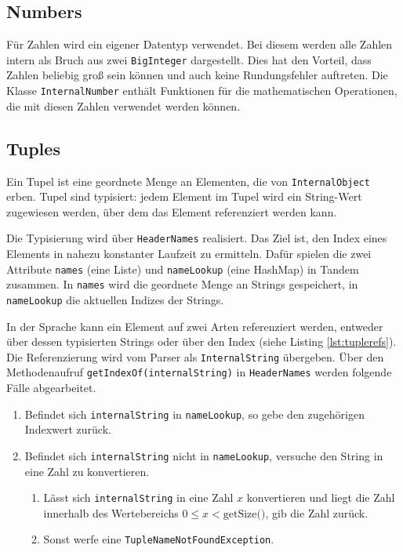 \subsection{Numbers}
Für Zahlen wird ein eigener Datentyp verwendet. Bei diesem werden alle Zahlen intern als Bruch aus zwei \texttt{BigInteger} dargestellt. Dies hat den Vorteil, dass Zahlen beliebig groß sein können und auch keine Rundungsfehler auftreten. Die Klasse \texttt{InternalNumber} enthält Funktionen für die mathematischen Operationen, die mit diesen Zahlen verwendet werden können.

\subsection{Tuples}

Ein Tupel ist eine geordnete Menge an Elementen, die von \lstinline{InternalObject} erben.
Tupel sind typisiert: jedem Element im Tupel wird ein String-Wert zugewiesen werden, über dem
das Element referenziert werden kann.

Die Typisierung wird über \lstinline{HeaderNames} realisiert. Das Ziel ist, den Index
eines Elements in nahezu konstanter Laufzeit zu ermitteln. Dafür spielen die zwei Attribute
\lstinline{names} (eine Liste) und \lstinline{nameLookup} (eine HashMap) in Tandem zusammen.
In \lstinline{names} wird die geordnete Menge an Strings gespeichert, in \lstinline{nameLookup}
die aktuellen Indizes der Strings.

In der Sprache kann ein Element auf zwei Arten referenziert werden, entweder über dessen typisierten Strings oder
über den Index (siehe Listing \ref{lst:tuplerefs}). Die Referenzierung wird vom Parser als \lstinline{InternalString}
übergeben. Über den Methodenaufruf \lstinline{getIndexOf(internalString)} in \lstinline{HeaderNames}
werden folgende Fälle abgearbeitet.

\begin{enumerate}
    \item Befindet sich \lstinline{internalString} in \lstinline{nameLookup}, so gebe den zugehörigen Indexwert zurück.
    \item Befindet sich \lstinline{internalString} nicht in \lstinline{nameLookup}, versuche den String in eine Zahl zu konvertieren.
    \begin{enumerate}
        \item Lässt sich \lstinline{internalString} in eine Zahl $x$ konvertieren und liegt die Zahl innerhalb des Wertebereichs $0 \leq x < \textrm{getSize()}$, gib die Zahl zurück.
        \item Sonst werfe eine \lstinline{TupleNameNotFoundException}.
    \end{enumerate}
\end{enumerate}

